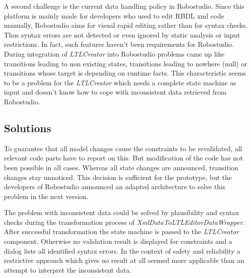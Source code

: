 A second challenge is the current data handling policy in Robostudio. Since this platform is mainly made for developers who used to edit RBDL xml code manually, Robostudio aims for visual rapid editing rather than for syntax checks. Thus syntax errors are not detected or even ignored by static analysis or input restrictions. In fact, such features haven't been requirements for Robostudio. During integration of \emph{LTLCreator} into Robostudio problems came up like transitions leading to non existing states, transitions leading to nowhere (null) or transitions whose target is depending on runtime facts.
This characteristic seems to be a problem for the \emph{LTLCreator} which needs a complete state machine as input and doesn't know how to cope with inconsistent data retrieved from Robostudio.




\subsection{Solutions}

To guarantee that all model changes cause the constraints to be revalidated, all relevant code parts have to report on this. But modification of the code has not been possible in all cases. Whereas all state changes are announced, transition changes stay unnoticed. This decision is sufficient for the prototype, but the developers of Robostudio announced an adapted architecture to solve this problem in the next version.


The problem with inconsistent data could be solved by plausibility and syntax checks during the transformation process of \emph{XmlDataToLTLEditorDataWrapper}. After successful transformation the state machine is passed to the \emph{LTLCreator} component. Otherwise no validation result is displayed for constraints and a dialog lists all identified syntax errors. In the context of safety and reliability a restrictive approach which gives no result at all seemed more applicable than an attempt to interpret the inconsistent data. 